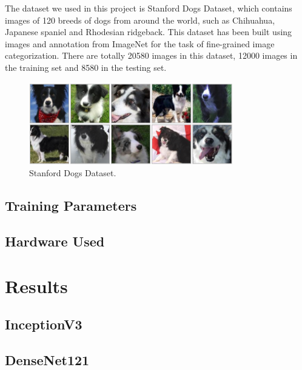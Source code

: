 \documentclass{article}
\begin{document}
The dataset we used in this project is Stanford Dogs Dataset, which contains images of 120 breeds of dogs from around the world, such as Chihuahua, Japanese spaniel and Rhodesian ridgeback. This dataset has been built using images and annotation from ImageNet for the task of fine-grained image categorization. There are totally 20580 images in this dataset, 12000 images in the training set and 8580 in the testing set.

\begin{figure}[H]
	\centering
	\includegraphics[width=3.5in]{pics/dogs} 
	\caption{Stanford Dogs Dataset.}
\end{figure}


\subsection{Training Parameters}
\subsection{Hardware Used}

\newpage
\section{Results}

\subsection{InceptionV3}
\subsection{DenseNet121}
\end{document}
